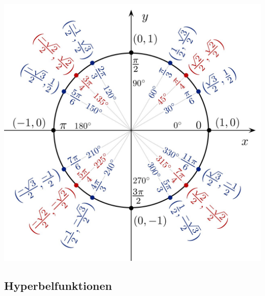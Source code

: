 \begin{multicols*}{3}
    \begin{center}
        \includegraphics[width=1\linewidth]{Bilder/unit-circle.jpg}
    \end{center}
    \vfill\null
    \columnbreak

    \subsection{Hyperbelfunktionen}


\end{multicols*}
